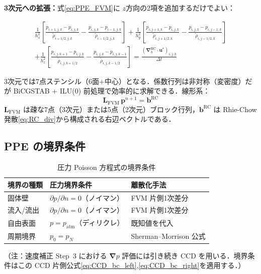 \documentclass[12pt, a4paper, titlepage]{article}
\newcommand{\jp}[1]{{\normalfont\jpfont #1}}
\newcommand{\bu}{\bm{u}}
\newcommand{\bnabla}{\bm{\nabla}}
\begin{document}
\jp{\textbf{3次元への拡張：}式\eqref{eq:PPE_FVM}に $z$方向の2項を追加するだけでよい：}
\begin{tcolorbox}[mybox, title={\jp{FVM 変密度 PPE（3次元，7点ステンシル）}}]
\begin{multline}
  \frac{1}{h_x^2}\!\left[\frac{p_{i+1,j,k}-p_{i,j,k}}{\tilde\rho_{i+1/2,j,k}}-\frac{p_{i,j,k}-p_{i-1,j,k}}{\tilde\rho_{i-1/2,j,k}}\right]
  + \frac{1}{h_y^2}\!\left[\frac{p_{i,j+1,k}-p_{i,j,k}}{\tilde\rho_{i,j+1/2,k}}-\frac{p_{i,j,k}-p_{i,j-1,k}}{\tilde\rho_{i,j-1/2,k}}\right]\\
  + \frac{1}{h_z^2}\!\left[\frac{p_{i,j,k+1}-p_{i,j,k}}{\tilde\rho_{i,j,k+1/2}}-\frac{p_{i,j,k}-p_{i,j,k-1}}{\tilde\rho_{i,j,k-1/2}}\right]
  = \frac{(\bnabla_h^{\mathrm{RC}}\!\cdot\bu^*)_{i,j,k}}{\Delta t}
  \label{eq:PPE_FVM_3D}
\end{multline}
\end{tcolorbox}
\jp{3次元では7点ステンシル（6面$+$中心）となる．係数行列は非対称（変密度）だが
BiCGSTAB + ILU(0) 前処理で効率的に求解できる．線形系：}
\begin{equation}
  \bm{L}_{\mathrm{FVM}}\,\bm{p}^{n+1} = \bm{b}^{\mathrm{RC}}
  \label{eq:PPE_linear_system}
\end{equation}
\jp{$\bm{L}_{\mathrm{FVM}}$ は疎な7点（3次元）または5点（2次元）ブロック行列，$\bm{b}^{\mathrm{RC}}$ は Rhie-Chow 発散\eqref{eq:RC_div}から構成される右辺ベクトルである．}

\subsection{PPE \jp{の境界条件}}

\begin{table}[h]
\centering
\caption{\jp{圧力 Poisson 方程式の境界条件}}
\begin{tabular}{lll}
\toprule
\jp{境界の種類} & \jp{圧力境界条件} & \jp{離散化手法}\\
\midrule
\jp{固体壁} & $\partial p/\partial n = 0$\jp{（ノイマン）} & \jp{FVM 片側1次差分}\\
\jp{流入/流出} & $\partial p/\partial n = 0$\jp{（ノイマン）} & \jp{FVM 片側1次差分}\\
\jp{自由表面} & $p = p_{\mathrm{atm}}$\jp{（ディリクレ）} & \jp{既知値を代入}\\
\jp{周期境界} & $p_0 = p_N$ & Sherman--Morrison \jp{公式}\\
\bottomrule
\end{tabular}
\end{table}
\jp{（注：速度補正 Step~3 における $\bnabla p$ 評価には引き続き CCD を用いる．境界条件はこの CCD 片側公式\eqref{eq:CCD_bc_left},\eqref{eq:CCD_bc_right}を適用する．）}
\end{document}
